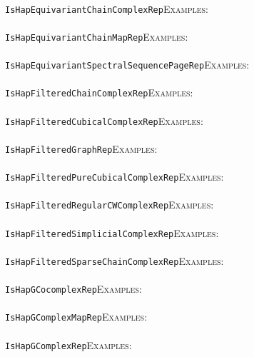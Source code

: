 \documentclass[a4paper,11pt]{report}
\begin{document}
{{ \\
 \texttt{IsHapEquivariantChainComplexRep}{\nobreakspace}{\nobreakspace}{\nobreakspace}{\nobreakspace}\textsc{Examples:} \\
 \\
 \texttt{IsHapEquivariantChainMapRep}{\nobreakspace}{\nobreakspace}{\nobreakspace}{\nobreakspace}\textsc{Examples:} \\
 \\
 \texttt{IsHapEquivariantSpectralSequencePageRep}{\nobreakspace}{\nobreakspace}{\nobreakspace}{\nobreakspace}\textsc{Examples:} \\
 \\
 \texttt{IsHapFilteredChainComplexRep}{\nobreakspace}{\nobreakspace}{\nobreakspace}{\nobreakspace}\textsc{Examples:} \\
 \\
 \texttt{IsHapFilteredCubicalComplexRep}{\nobreakspace}{\nobreakspace}{\nobreakspace}{\nobreakspace}\textsc{Examples:} \\
 \\
 \texttt{IsHapFilteredGraphRep}{\nobreakspace}{\nobreakspace}{\nobreakspace}{\nobreakspace}\textsc{Examples:} \\
 \\
 \texttt{IsHapFilteredPureCubicalComplexRep}{\nobreakspace}{\nobreakspace}{\nobreakspace}{\nobreakspace}\textsc{Examples:} \\
 \\
 \texttt{IsHapFilteredRegularCWComplexRep}{\nobreakspace}{\nobreakspace}{\nobreakspace}{\nobreakspace}\textsc{Examples:} \\
 \\
 \texttt{IsHapFilteredSimplicialComplexRep}{\nobreakspace}{\nobreakspace}{\nobreakspace}{\nobreakspace}\textsc{Examples:} \\
 \\
 \texttt{IsHapFilteredSparseChainComplexRep}{\nobreakspace}{\nobreakspace}{\nobreakspace}{\nobreakspace}\textsc{Examples:} \\
 \\
 \texttt{IsHapGCocomplexRep}{\nobreakspace}{\nobreakspace}{\nobreakspace}{\nobreakspace}\textsc{Examples:} \\
 \\
 \texttt{IsHapGComplexMapRep}{\nobreakspace}{\nobreakspace}{\nobreakspace}{\nobreakspace}\textsc{Examples:} \\
 \\
 \texttt{IsHapGComplexRep}{\nobreakspace}{\nobreakspace}{\nobreakspace}{\nobreakspace}\textsc{Examples:} \\
}}
\end{document}
